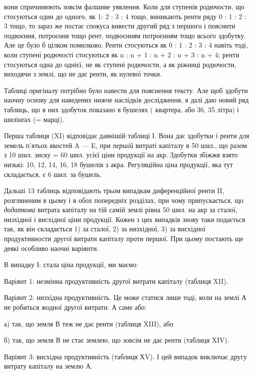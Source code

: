 \parcont{}  %
вони спричинюють зовсім фалшиве уявлення. Коли для ступенів родючости, що
стосуються один до одного, як 1: 2 : 3 : 4 тощо, виникають ренти ряду 0 : 1 : 2 : 3
тощо, то зараз же постає спокуса вивести другий ряд з першого і пояснити
подвоєння, потроєння тощо рент, подвоєнням потроєнням тощо всього здобутку.
Але це було б цілком помилково. Ренти стосуються як 0 : 1 : 2 : 3 : 4 навіть
тоді, коли ступені родючості стосуються як n : n + 1 : n + 2 : n + 3 : n + 4;
ренти стосуються одна до однієї, не як ступені родючости, а як ріжниці родючости,
виходячи з землі, що не дає ренти, як нулевої точки.

Таблиці оригіналу потрібно було навести для пояснення тексту. Але щоб
здобути наочну основу для наведених нижче наслідків дослідження, я далі
даю новий ряд таблиць, що в них здобуток показано в бушелях (  квартера,
або 36, 35 літра) і шилінґах (= марці).

Перша таблиця (XI) відповідає давнішій таблиці І. Вона дає здобутки
і ренти для земель п’ятьох якостей A — E, при \emph{першій} витраті капіталу в 50
шил., що разом з 10 шил. зиску = 60 шил. усієї ціни продукції на акр. Здобутки
збіжжя взято низькі: 10, 12, 14, 16, 18 бушелів з акра. Регуляційна
ціна продукції, яка тут складається, є 6 шил. за бушель.

Дальші 13 таблиць відповідають трьом випадкам диференційної ренти II,
розгляненим в цьому і в обох попередніх розділах, при чому припускається, що
\emph{додаткова} витрата капіталу на тій самій землі рівна 50 шил. на акр за сталої,
низхідної і висхідної ціни продукції. Кожен з цих випадків знову таки
подається так, як він складається 1) за сталої, 2) за низхідної, 3) за висхідної
продуктивности другої витрати капіталу проти першої. При цьому постають ще
деякі особливо наочні варіянти.

В випадку І: стала ціна продукції, ми маємо:

Варіянт 1: незмінна продуктивність другої витрати капіталу (таблиця XII).

Варіянт 2: низхідна продуктивність. Це може статися лише тоді, коли на землі
А не робиться жодної другої витрати. А саме або:

а) так, що земля В теж не дає ренти (таблиця XIII), або

б) так, що земля В не стає землею, що зовсім не дає ренти (таблиця XIV).

Варіянт 3: висхідна продуктивність (таблиця ХV). І цей випадок виключає
другу витрату капіталу на землю А.

